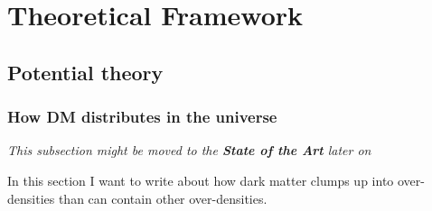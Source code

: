 \chapter{Theoretical Framework}

\section{Potential theory}

\subsection{How DM distributes in the universe}

\begin{large}
{\textit{This subsection might be moved to the \textbf{State of the Art} later on}}
\end{large}

In this section I want to write about how dark matter clumps up into over-densities than can contain other over-densities.

\section{}